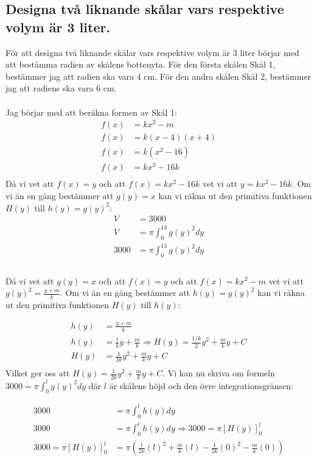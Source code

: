 \documentclass[12pt]{article}
\begin{document}
\subsection*{Designa två liknande skålar vars respektive volym är 3 liter.}

För att designa två liknande skålar vars respektive volym är 3 liter börjar med att bestämma radien av skålens bottenyta. För den första skålen Skål 1, bestämmer jag att radien ska vara 4 cm. För den andra skålen Skål 2, bestämmer jag att radiens ska vara 6 cm.
\\\\
Jag börjar med att beräkna formen av Skål 1:
\begin{align*}
    f(x)&=kx^2-m\\
    f(x)&=k(x-4)(x+4)\\
    f(x)&=k(x^2-16)\\
    f(x)&=kx^2-16k\\
\end{align*}
Då vi vet att $f(x)=y$ och att $f(x)=kx^2-16k$ vet vi att $y=kx^2-16k$. Om vi än en gång bestämmer att $g(y)=x$ kan vi räkna ut den primitiva funktionen $H(y)$ till $h(y)={g(y)}^2$:
\begin{align*}
    V&=3000\\
    V&=\pi\int_{0}^{13}{g(y)}^2dy\\
    3000&=\pi\int_{0}^{13}{g(y)}^2dy\\
\end{align*}\\
Då vi vet att $g(y)=x$ och att $f(x)=y$ och att $f(x)=kx^2-m$ vet vi att ${g(y)}^2=\frac{y+m}{k}$. Om vi än en gång bestämmer att $h(y)={g(y)}^2$ kan vi räkna ut den primitiva funktionen $H(y)$ till $h(y)$:

\begin{align*}
    h(y)&=\frac{y+m}{k}\\
    h(y)&=\frac{1}{k}y+\frac{m}{k} \Rightarrow H(y)=\frac{1/k}{2}y^2+\frac{m}{k}y+C\\
    H(y)&=\frac{1}{2k}y^2+\frac{m}{k}y+C\\
\end{align*}
Vilket ger oss att $H(y)=\frac{1}{2k}y^2+\frac{m}{k}y+C$.
Vi kan nu skriva om formeln $3000=\pi\int_{0}^{l}{g(y)}^2dy$ där $l$ är skålens höjd och den övre integrationsgränsen:

\begin{align*}
    3000&=\pi\int_{0}^{l}{h(y)}dy\\
    3000&=\pi\int_{0}^{l}{h(y)}dy\Rightarrow 3000=\pi{\left[{H(y)}\right]}_{0}^{l}\\
    3000=\pi{\left[{H(y)}\right]}_{0}^{l}&=\pi\left(\frac{1}{2k}{(l)}^2+\frac{m}{k}(l)-\frac{1}{2k}{(0)}^2-\frac{m}{k}(0)\right)\\
\end{align*}
\end{document}
